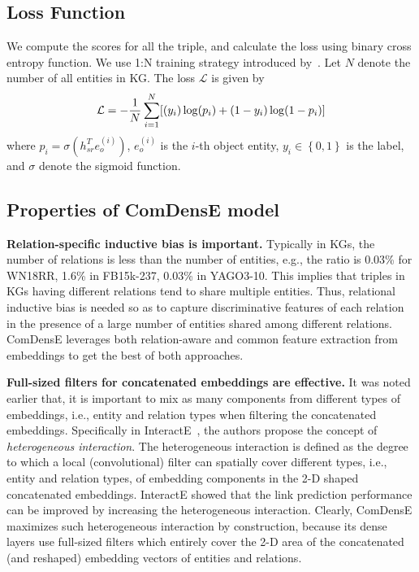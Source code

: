 \subsection{Loss Function}
We compute the scores for all the triple, and calculate the loss using binary cross entropy function. We use 1:N training strategy introduced by~\cite{dettmers2018convolutional}. Let $N$ denote the number of all entities in KG. The loss $\mathcal{L}$ is given by
\begin{equation}
\mathcal{L} = -{1 \over N} \sum_{i=1}^N [(y_i) \log (p_i) + (1-y_i) \log (1-p_i)]
\label{eq5}
\end{equation}
where $p_i = \sigma(h_{sr}^Te_o^{(i)})$, $e_o^{(i)}$ is the $i$-th object entity, $y_i \in \left\{ 0,1 \right\}$ is the label, and $\sigma$ denote the sigmoid function.

\subsection{Properties of ComDensE model}

\noindent\textbf{Relation-specific inductive bias is important.} Typically in KGs, the number of relations is less than the number of entities, e.g., the ratio is 0.03\% for WN18RR, 1.6\% in FB15k-237, 0.03\% in YAGO3-10. This implies that triples in KGs having different relations tend to share multiple entities. Thus, relational inductive bias is needed so as to capture discriminative features of each relation in the presence of a large number of entities shared among different relations. ComDensE leverages both relation-aware and common feature extraction from embeddings to get the best of both approaches.

\noindent\textbf{Full-sized filters for concatenated embeddings are effective.} It was noted earlier that, it is important to mix as many components from different types of embeddings, i.e., entity and relation types when filtering the concatenated embeddings. Specifically in InteractE~\cite{vashishth2020interacte}, the authors propose the concept of  {\em heterogeneous interaction}. The heterogeneous interaction is defined as the degree to which a local (convolutional) filter can spatially cover different types, i.e., entity and relation types, of embedding components in the 2-D shaped concatenated embeddings. InteractE showed that the link prediction performance can be improved by increasing the heterogeneous interaction. Clearly, ComDensE maximizes such heterogeneous interaction by construction, because its dense layers use full-sized filters which entirely cover the 2-D area of the concatenated (and reshaped) embedding vectors of entities and relations.

